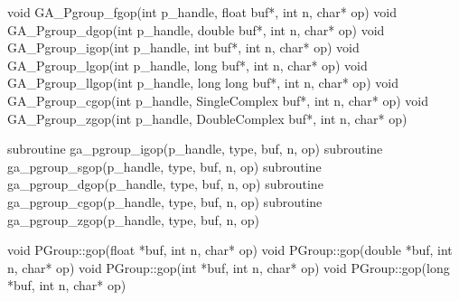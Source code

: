 \documentclass[12pt]{article}
\begin{document}

\begin{capi}
\begin{ccode}
void GA_Pgroup_fgop(int p_handle, float buf*, int n, char* op)
void GA_Pgroup_dgop(int p_handle, double buf*, int n, char* op)
void GA_Pgroup_igop(int p_handle, int buf*, int n, char* op)
void GA_Pgroup_lgop(int p_handle, long buf*, int n, char* op)
void GA_Pgroup_llgop(int p_handle, long long buf*, int n, char* op)
void GA_Pgroup_cgop(int p_handle, SingleComplex buf*, int n, char* op)
void GA_Pgroup_zgop(int p_handle, DoubleComplex buf*, int n, char* op)
\end{ccode}
\begin{funcargs}
\end{funcargs}
\end{capi}

\begin{fapi}
\begin{fcode}
subroutine ga_pgroup_igop(p_handle, type, buf, n, op)
subroutine ga_pgroup_sgop(p_handle, type, buf, n, op)
subroutine ga_pgroup_dgop(p_handle, type, buf, n, op)
subroutine ga_pgroup_cgop(p_handle, type, buf, n, op)
subroutine ga_pgroup_zgop(p_handle, type, buf, n, op)
\end{fcode}
\begin{funcargs}
\end{funcargs}
\end{fapi}

\begin{cxxapi}
\begin{cxxcode}
void PGroup::gop(float *buf, int n, char* op)
void PGroup::gop(double *buf, int n, char* op)
void PGroup::gop(int *buf, int n, char* op)
void PGroup::gop(long *buf, int n, char* op)
\end{cxxcode}
\begin{funcargs}
\end{funcargs}
\end{cxxapi}
\end{document}
